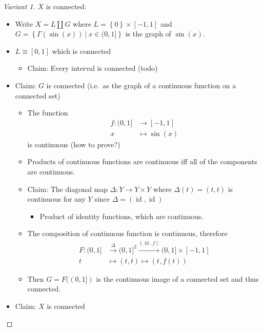 \begin{solution}

\envlist

\begin{proof}[Variant 1]

\(X\) is connected:

\begin{itemize}
\tightlist
\item
  Write \(X = L{\textstyle\coprod}G\) where
  \(L = \left\{{0}\right\} \times[-1, 1]\) and
  \(G = \left\{{\Gamma(\sin(x)) {~\mathrel{\Big|}~}x\in (0, 1]}\right\}\)
  is the graph of \(\sin(x)\).
\item
  \(L \cong [0, 1]\) which is connected

  \begin{itemize}
  \tightlist
  \item
    Claim: Every interval is connected (todo)
  \end{itemize}
\item
  Claim: \(G\) is connected (i.e.~as the graph of a continuous function
  on a connected set)

  \begin{itemize}
  \tightlist
  \item
    The function
    \begin{align*}     f: (0, 1] &\to [-1, 1] \\     x &\mapsto \sin(x)     \end{align*}
    is continuous (how to prove?)
  \item
    Products of continuous functions are continuous iff all of the
    components are continuous.
  \item
    Claim: The diagonal map \(\Delta: Y\to Y\times Y\) where
    \(\Delta(t) = (t, t)\) is continuous for any \(Y\) since
    \(\Delta = (\operatorname{id}, \operatorname{id})\)

    \begin{itemize}
    \tightlist
    \item
      Product of identity functions, which are continuous.
    \end{itemize}
  \item
    The composition of continuous function is continuous, therefore
    \begin{align*}     F : (0, 1] &\xrightarrow{\Delta} (0, 1]^2 \xrightarrow{(\operatorname{id}, f)} (0, 1] \times[-1, 1]  \\     t &\mapsto (t, t) \mapsto (t, f(t))     \end{align*}
  \item
    Then \(G = F((0, 1])\) is the continuous image of a connected set
    and thus connected.
  \end{itemize}
\item
  Claim: \(X\) is connected


\end{itemize}
\end{proof}
\end{solution}
